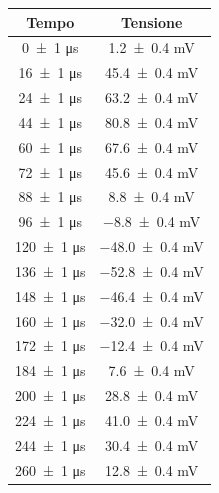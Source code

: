 \documentclass[a4paper]{article}
\begin{document}
\begin{appendices}
\begin{table}[htbp]
    \centering
    \begin{minipage}{0.48\textwidth}
        \centering\small
        \begin{tabular}{|c|c|}
        \hline
        Tempo & Tensione \\\hline\hline %
        \num{0 \pm 1} \si{\micro\second} & \num{1.2 \pm 0.4} \si{\milli\volt} \\
        \num{16 \pm 1} \si{\micro\second} & \num{45.4 \pm 0.4} \si{\milli\volt} \\
        \num{24 \pm 1} \si{\micro\second} & \num{63.2 \pm 0.4} \si{\milli\volt} \\
        \num{44 \pm 1} \si{\micro\second} & \num{80.8 \pm 0.4} \si{\milli\volt} \\
        \num{60 \pm 1} \si{\micro\second} & \num{67.6 \pm 0.4} \si{\milli\volt} \\
        \num{72 \pm 1} \si{\micro\second} & \num{45.6 \pm 0.4} \si{\milli\volt} \\
        \num{88 \pm 1} \si{\micro\second} & \num{8.8 \pm 0.4} \si{\milli\volt} \\
        \num{96 \pm 1} \si{\micro\second} & \num{-8.8 \pm 0.4} \si{\milli\volt} \\
        \num{120 \pm 1} \si{\micro\second} & \num{-48.0 \pm 0.4} \si{\milli\volt} \\
        \num{136 \pm 1} \si{\micro\second} & \num{-52.8 \pm 0.4} \si{\milli\volt} \\
        \num{148 \pm 1} \si{\micro\second} & \num{-46.4 \pm 0.4} \si{\milli\volt} \\
        \num{160 \pm 1} \si{\micro\second} & \num{-32.0 \pm 0.4} \si{\milli\volt} \\
        \num{172 \pm 1} \si{\micro\second} & \num{-12.4 \pm 0.4} \si{\milli\volt} \\
        \num{184 \pm 1} \si{\micro\second} & \num{7.6 \pm 0.4} \si{\milli\volt} \\
        \num{200 \pm 1} \si{\micro\second} & \num{28.8 \pm 0.4} \si{\milli\volt} \\
        \num{224 \pm 1} \si{\micro\second} & \num{41.0 \pm 0.4} \si{\milli\volt} \\ %
        \num{244 \pm 1} \si{\micro\second} & \num{30.4 \pm 0.4} \si{\milli\volt} \\
        \num{260 \pm 1} \si{\micro\second} & \num{12.8 \pm 0.4} \si{\milli\volt} \\

\end{tabular}
\end{minipage}
\end{table}
\end{appendices}
\end{document}
